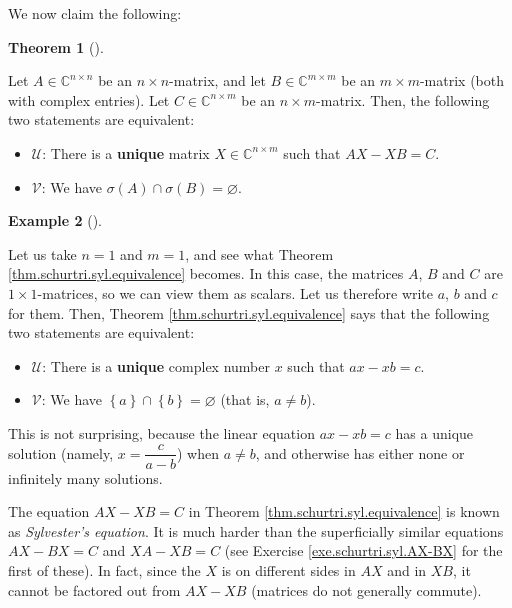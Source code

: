 \documentclass[numbers=enddot,12pt,final,onecolumn,notitlepage]{scrartcl}%
\numberwithin{exer}{subsection}
\theoremstyle{definition}
\newtheorem{theo}{Theorem}[subsection]
\newenvironment{theorem}[1][]
{\begin{theo}[#1]\begin{leftbar}}
{\end{leftbar}\end{theo}}
\newtheorem{exam}[theo]{Example}
\newenvironment{example}[1][]
{\begin{exam}[#1]\begin{leftbar}}
{\end{leftbar}\end{exam}}
\begin{document}
We now claim the following:

\begin{theorem}
\label{thm.schurtri.syl.equivalence}Let $A\in\mathbb{C}^{n\times n}$ be an
$n\times n$-matrix, and let $B\in\mathbb{C}^{m\times m}$ be an $m\times
m$-matrix (both with complex entries). Let $C\in\mathbb{C}^{n\times m}$ be an
$n\times m$-matrix. Then, the following two statements are equivalent:

\begin{itemize}
\item $\mathcal{U}$: There is a \textbf{unique} matrix $X\in\mathbb{C}%
^{n\times m}$ such that $AX-XB=C$.

\item $\mathcal{V}$: We have $\sigma\left(  A\right)  \cap\sigma\left(
B\right)  =\varnothing$.
\end{itemize}
\end{theorem}

\begin{example}
Let us take $n=1$ and $m=1$, and see what Theorem
\ref{thm.schurtri.syl.equivalence} becomes. In this case, the matrices $A$,
$B$ and $C$ are $1\times1$-matrices, so we can view them as scalars. Let us
therefore write $a$, $b$ and $c$ for them. Then, Theorem
\ref{thm.schurtri.syl.equivalence} says that the following two statements are equivalent:

\begin{itemize}
\item $\mathcal{U}$: There is a \textbf{unique} complex number $x$ such that
$ax-xb=c$.

\item $\mathcal{V}$: We have $\left\{  a\right\}  \cap\left\{  b\right\}
=\varnothing$ (that is, $a\neq b$).
\end{itemize}

This is not surprising, because the linear equation $ax-xb=c$ has a unique
solution (namely, $x=\dfrac{c}{a-b}$) when $a\neq b$, and otherwise has either
none or infinitely many solutions.
\end{example}

The equation $AX-XB=C$ in Theorem \ref{thm.schurtri.syl.equivalence} is known
as \emph{Sylvester's equation}. It is much harder than the superficially
similar equations $AX-BX=C$ and $XA-XB=C$ (see Exercise
\ref{exe.schurtri.syl.AX-BX} for the first of these). In fact, since the $X$
is on different sides in $AX$ and in $XB$, it cannot be factored out from
$AX-XB$ (matrices do not generally commute).
\end{document}
